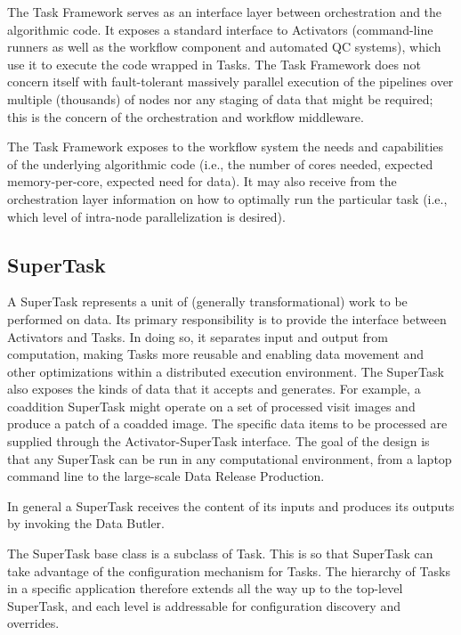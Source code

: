 \documentclass[DM,lsstdraft,toc]{lsstdoc}
\begin{document}
The Task Framework serves as an interface layer between orchestration
and the algorithmic code. It exposes a standard interface to Activators
(command-line runners as well as the workflow component and automated QC
systems), which use it to execute the code wrapped in Tasks. The Task Framework
does not concern itself with fault-tolerant massively parallel execution of the
pipelines over multiple (thousands) of nodes nor any staging of data that might
be required; this is the concern of the orchestration and workflow middleware.

The Task Framework exposes to the workflow system the needs and capabilities
of the underlying algorithmic code (i.e., the number of cores needed, expected
memory-per-core, expected need for data). It may also receive from the
orchestration layer information on how to optimally run the particular task
(i.e., which level of intra-node parallelization is desired).


\subsection{SuperTask}\label{supertask}

A SuperTask represents a unit of (generally transformational) work to be
performed on data.  Its primary responsibility is to provide the interface
between Activators and Tasks.  In doing so, it separates input and output from
computation, making Tasks more reusable and enabling data movement and other
optimizations within a distributed execution environment.  The SuperTask also
exposes the kinds of data that it accepts and generates.  For example, a
coaddition SuperTask might operate on a set of processed visit images and
produce a patch of a coadded image.  The specific data items to be processed
are supplied through the Activator-SuperTask interface.  The goal of the
design is that any SuperTask can be run in any computational environment,
from a laptop command line to the large-scale Data Release Production.

In general a SuperTask receives the content of its inputs and produces its
outputs by invoking the Data Butler.

The SuperTask base class is a subclass of Task. This is so that SuperTask can
take advantage of the configuration mechanism for Tasks. The hierarchy of Tasks
in a specific application therefore extends all the way up to the top-level
SuperTask, and each level is addressable for configuration discovery and
overrides.
\end{document}
